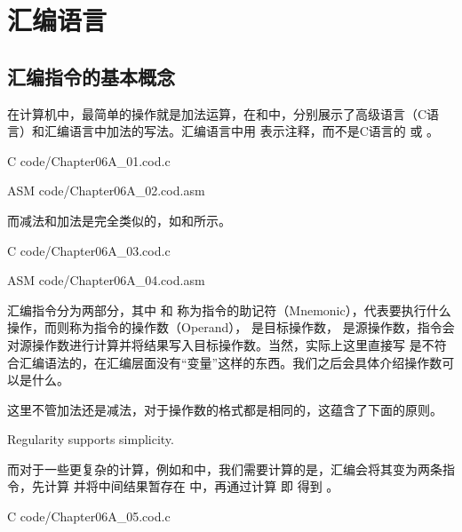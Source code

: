 \section{汇编语言}

\subsection{汇编指令的基本概念}

在计算机中，最简单的操作就是加法运算，在和中，分别展示了高级语言（C语言）和汇编语言中加法的写法。汇编语言中用\codex{#} 表示注释，而不是C语言的\codex{//} 或\codex{/**/} 。

\begin{Code}[高级语言中的加法]{C}
    code/Chapter06A_01.cod.c
\end{Code}

\begin{Code}[汇编语言中的加法]{ASM}
    code/Chapter06A_02.cod.asm
\end{Code}

而减法和加法是完全类似的，如和所示。\goodbreak

\begin{Code}[高级语言中的减法]{C}
    code/Chapter06A_03.cod.c
\end{Code}

\begin{Code}[汇编语言中的减法]{ASM}
    code/Chapter06A_04.cod.asm
\end{Code}

汇编指令分为两部分，其中 和 称为指令的助记符（Mnemonic），代表要执行什么操作，而则称为指令的操作数（Operand）， 是目标操作数， 是源操作数，指令会对源操作数进行计算并将结果写入目标操作数。当然，实际上这里直接写 是不符合汇编语法的，在汇编层面没有“变量”这样的东西。我们之后会具体介绍操作数可以是什么。

这里不管加法还是减法，对于操作数的格式都是相同的，这蕴含了下面的原则。
\begin{BoxDesignPrinciple}[规律性即简洁性]
    \centering
    Regularity supports simplicity.
\end{BoxDesignPrinciple}

而对于一些更复杂的计算，例如和中，我们需要计算的是，汇编会将其变为两条指令，先计算 并将中间结果暂存在 中，再通过计算 即 得到 。
\begin{Code}[高级语言中的复杂计算]{C}
    code/Chapter06A_05.cod.c
\end{Code}

